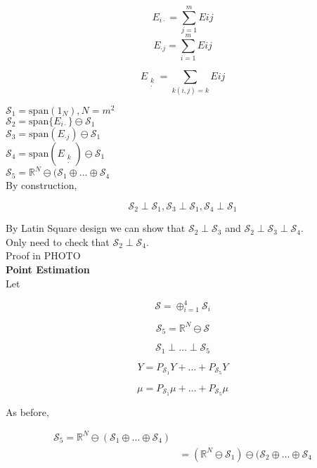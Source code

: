 \documentclass[11pt,fleqn]{book} %
\begin{document}
		$$E_{i\cdot} = \sum^m_{j=1} E{ij} $$
		$$E_{\cdot j} = \sum^m_{i=1} E{ij} $$

		$$E_{\begin{matrix}
				k\\
				\cdot
			\end{matrix}} = \sum_{k(i,j) = k} E{ij} $$


$\mathcal{S}_1 = \text{span}(1_N), N = m^2 $\\
$\mathcal{S}_2 = \text{span}\{E_{i \cdot}\} \ominus \mathcal{S}_1$\\
$\mathcal{S}_3 = \text{span}(E_{\cdot j})\ominus \mathcal{S}_1 $\\
$\mathcal{S}_4 = \text{span}(E_{\begin{matrix}
				k\\
				\cdot
			\end{matrix}})\ominus \mathcal{S}_1 $\\
$\mathcal{S}_5 = \mathbb{R}^N \ominus (\mathcal{S}_1 \oplus \dots \oplus \mathcal{S}_4$\\


By construction, 
		
		$$\mathcal{S}_2 \perp \mathcal{S}_1,  \mathcal{S}_3 \perp \mathcal{S}_1, \mathcal{S}_4 \perp \mathcal{S}_1$$

By Latin Square design we can show that $\mathcal{S}_2 \perp \mathcal{S}_3$ and $\mathcal{S}_2 \perp \mathcal{S}_3 \perp \mathcal{S}_4$. \\


Only need to check that $\mathcal{S}_2 \perp \mathcal{S}_4$. \\


Proof in PHOTO\\


\textbf{Point Estimation}\\

Let 

	$$\mathcal{S} = \oplus_{i=1}^4 \mathcal{S}_i$$

	$$\mathcal{S}_5 = \mathbb{R}^N \ominus \mathcal{S} $$

	$$\mathcal{S}_1 \perp \dots \perp \mathcal{S}_5  $$

	$$Y = P_{\mathcal{S}_1} Y + \dots + P_{\mathcal{S}_5} Y $$

	$$\mu = P_{\mathcal{S}_1} \mu + \dots + P_{\mathcal{S}_5 }\mu $$

As before, 

		\begin{align*}
			\mathcal{S}_5 = \mathbb{R}^N \ominus (\mathcal{S}_1 \oplus \dots \oplus \mathcal{S}_4)\\
				&= (\mathbb{R}^N \ominus \mathcal{S}_1) \ominus (\mathcal{S}_2 \oplus \dots \oplus \mathcal{S}_4
		\end{align*}  
\end{document}
